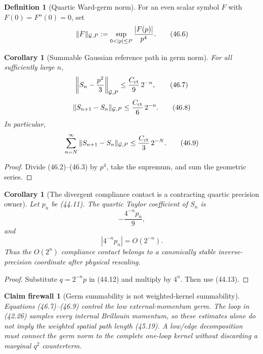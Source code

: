 \documentclass[11pt,oneside]{book}
\newtheorem{corollary}[theorem]{Corollary}
\newtheorem{firewall}[theorem]{Claim firewall}
\theoremstyle{definition}
\newtheorem{definition}[theorem]{Definition}
\theoremstyle{remark}
\begin{document}
\begin{definition}[Quartic Ward-germ norm]
\label{def:e8v46-germ-norm}
For an even scalar symbol \(F\) with
\(F(0)=F''(0)=0\), set
\[
 \|F\|_{{\cal G},P}
 :=\sup_{0<|p|\le P}\frac{|F(p)|}{p^4}.                         \tag{46.6}
\]
\end{definition}

\begin{corollary}[Summable Gaussian reference path in germ norm]
\label{cor:e8v46-germ-Cauchy}
For all sufficiently large \(n\),
\[
 \left\|S_n-\frac{p^2}{3}\right\|_{{\cal G},P}
 \le\frac{C_{\rm ct}}9\,2^{-n},                                \tag{46.7}
\]
\[
 \|S_{n+1}-S_n\|_{{\cal G},P}
 \le\frac{C_{\rm ct}}6\,2^{-n}.                                \tag{46.8}
\]
In particular,
\[
 \sum_{n=N}^\infty
 \|S_{n+1}-S_n\|_{{\cal G},P}
 \le\frac{C_{\rm ct}}3\,2^{-N}.                                \tag{46.9}
\]
\end{corollary}

\begin{proof}
Divide (46.2)--(46.3) by \(p^4\), take the supremum, and sum the
geometric series.
\end{proof}

\begin{corollary}[The divergent compliance contact is a contracting
quartic precision owner]
\label{cor:e8v46-contact-to-quartic}
Let \(p_n\) be (44.11).  The quartic Taylor coefficient of \(S_n\)
is
\[
 -\frac{4^{-n}p_n}{9},                                        \tag{46.10}
\]
and
\[
 |4^{-n}p_n|=O(2^{-n}).                                       \tag{46.11}
\]
Thus the \(O(2^n)\) compliance contact belongs to a canonically
stable inverse-precision coordinate after physical rescaling.
\end{corollary}

\begin{proof}
Substitute \(q=2^{-n}p\) in (44.12) and multiply by \(4^n\).
Then use (44.13).
\end{proof}

\begin{firewall}[Germ summability is not weighted-kernel summability]
\label{fire:e8v46-two-norm}
Equations (46.7)--(46.9) control the low external-momentum germ.
The loop in (42.26) samples every internal Brillouin momentum, so
these estimates alone do not imply the weighted spatial path length
(45.19).  A low/edge decomposition must connect the germ norm to the
complete one-loop kernel without discarding a marginal \(q^2\)
counterterm.
\end{firewall}
\end{document}
